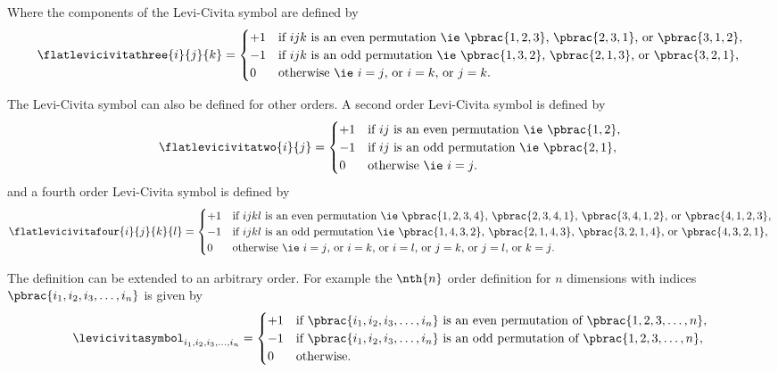 Where the components of the Levi-Civita symbol are defined by
\begin{equation}
  \flatlevicivitathree{i}{j}{k}=\begin{cases}
  +1&\text{if $ijk$ is an even permutation \ie $\pbrac{1,2,3}$, $\pbrac{2,3,1}$, or $\pbrac{3,1,2}$}, \\
  -1&\text{if $ijk$ is an odd permutation \ie $\pbrac{1,3,2}$, $\pbrac{2,1,3}$, or $\pbrac{3,2,1}$}, \\
  0 &\text{otherwise \ie $i=j$, or $i=k$, or $j=k$.}
  \end{cases}
  \label{eqn:DefinitionLeviCivitaSymbolThirdOrder}
\end{equation}

The Levi-Civita symbol can also be defined for other orders. A second
order Levi-Civita symbol is defined by
\begin{equation}
  \flatlevicivitatwo{i}{j}=\begin{cases}
  +1&\text{if $ij$ is an even permutation \ie $\pbrac{1,2}$}, \\
  -1&\text{if $ij$ is an odd permutation \ie $\pbrac{2,1}$}, \\
  0 &\text{otherwise \ie $i=j$.}
  \end{cases}
  \label{eqn:DefinitionLeviCivitaSymbolSecondOrder}
\end{equation}
and a fourth order Levi-Civita symbol is defined by
\begin{equation}
  \flatlevicivitafour{i}{j}{k}{l}=\begin{cases}
  +1&\text{if $ijkl$ is an even permutation \ie $\pbrac{1,2,3,4}$, $\pbrac{2,3,4,1}$, $\pbrac{3,4,1,2}$, or $\pbrac{4,1,2,3}$}, \\
  -1&\text{if $ijkl$ is an odd permutation \ie $\pbrac{1,4,3,2}$, $\pbrac{2,1,4,3}$, $\pbrac{3,2,1,4}$, or $\pbrac{4,3,2,1}$}, \\
  0 &\text{otherwise \ie $i=j$, or $i=k$, or $i=l$, or $j=k$, or $j=l$, or $k=j$.}
  \end{cases}
  \label{eqn:DefinitionLeviCivitaSymbolFourthOrder}
\end{equation}

The definition can be extended to an arbitrary order. For example the
$\nth{n}$ order definition for $n$ dimensions with indices
$\pbrac{i_{1},i_{2},i_{3},\ldots,i_{n}}$ is given by
\begin{equation}
  \levicivitasymbol_{i_{1},i_{2},i_{3},\ldots,i_{n}}=\begin{cases}
  +1&\text{if $\pbrac{i_{1},i_{2},i_{3},\ldots,i_{n}}$ is an even permutation of $\pbrac{1,2,3,\ldots,n}$}, \\
  -1&\text{if $\pbrac{i_{1},i_{2},i_{3},\ldots,i_{n}}$ is an odd permutation of $\pbrac{1,2,3,\ldots,n}$}, \\
  0 &\text{otherwise.}
  \end{cases}
  \label{eqn:DefinitionLeviCivitaSymbolNOrder}
\end{equation}

